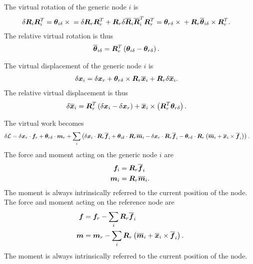 The virtual rotation of the generic node $i$ is
\begin{align}
	\delta\bm{R}_i \bm{R}_i^T
	&=
	\bm{\theta}_{i\delta}\times{}
	=
	\delta\bm{R}_r \bm{R}_r^T
	+
	\bm{R}_r \delta\overline{\bm{R}}_i \overline{\bm{R}}_i^T \bm{R}_r^T
	=
	\bm{\theta}_{r\delta}\times{}
	+
	\bm{R}_r \overline{\bm{\theta}}_{i\delta}\times \bm{R}_r^T
	.
\end{align}
The relative virtual rotation is thus
\begin{align}
	\overline{\bm{\theta}}_{i\delta}
	&=
	\bm{R}_r^T \left( \bm{\theta}_{i\delta} - \bm{\theta}_{r\delta} \right)
	.
\end{align}

The virtual displacement of the generic node $i$ is
\begin{align}
	\delta\bm{x}_i
	&=
	\delta\bm{x}_r
	+
	\bm{\theta}_{r\delta}\times \bm{R}_r \overline{\bm{x}}_i
	+
	\bm{R}_r\delta\overline{\bm{x}}_i
	.
\end{align}
The relative virtual displacement is thus
\begin{align}
	\delta\overline{\bm{x}}_i
	&=
	\bm{R}_r^T \left( 
		\delta\bm{x}_i
		-
		\delta\bm{x}_r
	 \right)
	+
	\overline{\bm{x}}_i \times \left( \bm{R}_r^T \bm{\theta}_{r\delta} \right)
	.
\end{align}

The virtual work becomes
\begin{align}
	\delta\mathcal{L}
	&=
	\delta\bm{x}_r \cdot \bm{f}_r
	+
	\bm{\theta}_{r\delta} \cdot \bm{m}_r
	+
	\sum_i \left( 
		\delta\bm{x}_i \cdot \bm{R}_r \overline{\bm{f}}_i
		+
		\bm{\theta}_{i\delta} \cdot \bm{R}_r \overline{\bm{m}}_i
		-
		\delta\bm{x}_r \cdot \bm{R}_r \overline{\bm{f}}_i
		-
		\bm{\theta}_{r\delta} \cdot \bm{R}_r \left( 
			\overline{\bm{m}}_i
			+
			\overline{\bm{x}}_i \times \overline{\bm{f}}_i
		 \right)
	 \right)
	.
\end{align}
The force and moment acting on the generic node $i$ are
\begin{align}
	\bm{f}_i
	&=
	\bm{R}_r \overline{\bm{f}}_i
	\\
	\bm{m}_i
	&=
	\bm{R}_r \overline{\bm{m}}_i
	.
\end{align}
The moment is always intrinsically referred to the current position
of the node.
The force and moment acting on the reference node are
\begin{align}
	\bm{f}
	&=
	\bm{f}_r - \sum_i \bm{R}_r \overline{\bm{f}}_i
	\\
	\bm{m}
	&=
	\bm{m}_r - \sum_i \bm{R}_r \left( 
		\overline{\bm{m}}_i
		+
		\overline{\bm{x}}_i \times \overline{\bm{f}}_i
	 \right)
	.
\end{align}
The moment is always intrinsically referred to the current position
of the node.

